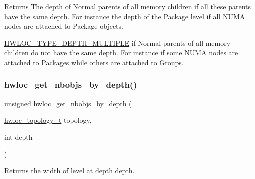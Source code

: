 \begin{DoxyReturn}{Returns}
The depth of Normal parents of all memory children if all these parents have the same depth. For instance the depth of the Package level if all N\+U\+MA nodes are attached to Package objects.

\hyperlink{a00187_ggaf4e663cf42bbe20756b849c6293ef575ae99465995cacde6c210d5fc2e409798c}{H\+W\+L\+O\+C\+\_\+\+T\+Y\+P\+E\+\_\+\+D\+E\+P\+T\+H\+\_\+\+M\+U\+L\+T\+I\+P\+LE} if Normal parents of all memory children do not have the same depth. For instance if some N\+U\+MA nodes are attached to Packages while others are attached to Groups. 
\end{DoxyReturn}
\mbox{\label{a00187_ga1d5ceafe8130fe6e8657bf0bc666ba50}} 
\subsubsection{\texorpdfstring{hwloc\+\_\+get\+\_\+nbobjs\+\_\+by\+\_\+depth()}{hwloc\_get\_nbobjs\_by\_depth()}}
{\footnotesize\ttfamily unsigned hwloc\+\_\+get\+\_\+nbobjs\+\_\+by\+\_\+depth (\begin{DoxyParamCaption}\item[{\hyperlink{a00186_ga9d1e76ee15a7dee158b786c30b6a6e38}{hwloc\+\_\+topology\+\_\+t}}]{topology,  }\item[{int}]{depth }\end{DoxyParamCaption})}



Returns the width of level at depth {\ttfamily depth}. 

\mbox{\label{a00187_ga789a3f65aedff644be64a18526a03065}} 
